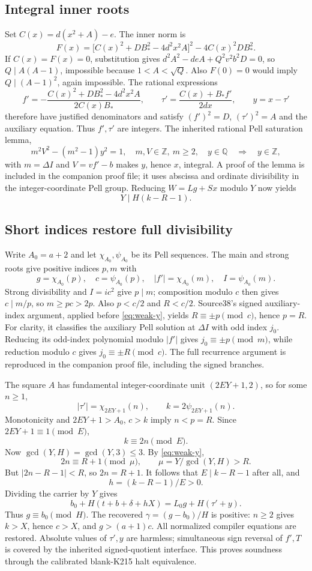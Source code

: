 \subsection{Integral inner roots}
Set $C(x)=d(x^2+A)-e$. The inner norm is
\[
 F(x)=\bigl[C(x)^2+DB_*^2-4d^2x^2A\bigr]^2
           -4C(x)^2DB_*^2.
\]
If $C(x)=F(x)=0$, substitution gives
$d^2A^2-deA+Q^2v^2b^2D=0$, so $Q\mid A(A-1)$, impossible because
$1<A<\sqrt Q$. Also $F(0)=0$ would imply $Q\mid(A-1)^2$, again
impossible. The rational expressions
\[
 f'=-\frac{C(x)^2+DB_*^2-4d^2x^2A}{2C(x)B_*},\qquad
 \tau'=\frac{C(x)+B_*f'}{2dx},\qquad y=x-\tau'
\]
therefore have justified denominators and satisfy $(f')^2=D$,
$(\tau')^2=A$ and the auxiliary equation. Thus $f',\tau'$ are integers.
The inherited rational Pell saturation lemma,
\[
 m^2V^2-(m^2-1)y^2=1,\quad m,V\in\mathbb Z,\ m\ge2,
 \quad y\in\mathbb Q\quad\Longrightarrow\quad y\in\mathbb Z,
\]
with $m=\Delta I$ and $V=vf'-b$ makes $y$, hence $x$, integral.
A proof of the lemma is included in the companion proof file; it uses
abscissa and ordinate divisibility in the integer-coordinate Pell group.
Reducing $W=Lg+Sx$ modulo $Y$ now yields
\begin{equation}\label{eq:weak-y}
 Y\mid H(k-R-1).
\end{equation}

\subsection{Short indices restore full divisibility}
Write $A_0=a+2$ and let $\chi_{A_0},\psi_{A_0}$ be its Pell sequences.
The main and strong roots give positive indices $p,m$ with
\[
 g=\chi_{A_0}(p),\quad c=\psi_{A_0}(p),\quad
 |f'|=\chi_{A_0}(m),\quad I=\psi_{A_0}(m).
\]
Strong divisibility and $I=ic^2$ give $p\mid m$; composition modulo $c$
then gives $c\mid m/p$, so $m\ge pc>2p$. Also $p<c/2$ and $R<c/2$.
Source38's signed auxiliary-index argument, applied before
\eqref{eq:weak-y}, yields $R\equiv\pm p\pmod c$, hence $p=R$.
For clarity, it classifies the auxiliary Pell solution at $\Delta I$
with odd index $j_0$. Reducing its odd-index polynomial modulo $|f'|$
gives $j_0\equiv\pm p\pmod m$, while reduction modulo $c$ gives
$j_0\equiv\pm R\pmod c$. The full recurrence argument is reproduced
in the companion proof file, including the signed branches.

The square $A$ has fundamental integer-coordinate unit
$(2EY+1,2)$, so for some $n\ge1$,
\[
 |\tau'|=\chi_{2EY+1}(n),\qquad k=2\psi_{2EY+1}(n).
\]
Monotonicity and $2EY+1>A_0$, $c>k$ imply $n<p=R$.
Since $2EY+1\equiv1\pmod E$,
\[
 k\equiv2n\pmod E.
\]
Now $\gcd(Y,H)=\gcd(Y,3)\le3$. By \eqref{eq:weak-y},
\[
 2n\equiv R+1\pmod\mu,\qquad
 \mu=Y/\gcd(Y,H)>R.
\]
But $|2n-R-1|<R$, so $2n=R+1$. It follows that
$E\mid k-R-1$ after all, and
\[
 h=(k-R-1)/E>0.
\]
Dividing the carrier by $Y$ gives
\[
 b_0+H(t+b+\delta+hX)=L_0g+H(\tau'+y).
\]
Thus $g\equiv b_0\pmod H$. The recovered
$\gamma=(g-b_0)/H$ is positive: $n\ge2$ gives $k>X$, hence $c>X$,
and $g>(a+1)c$.
All normalized compiler equations are restored. Absolute values of
$\tau',y$ are harmless; simultaneous sign reversal of $f',T$ is
covered by the inherited signed-quotient interface. This proves soundness
through the calibrated blank-K215 halt equivalence.

